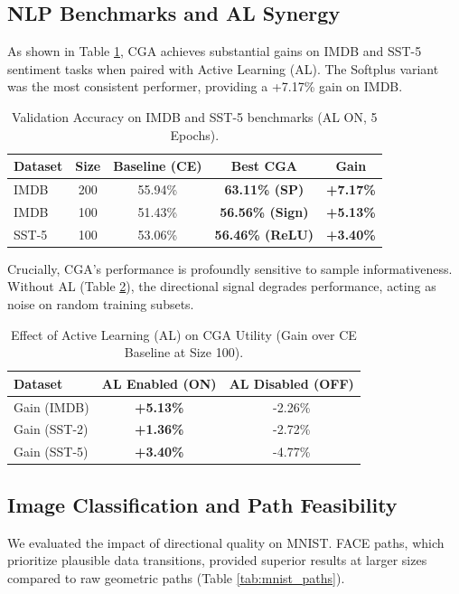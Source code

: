 \documentclass[sigconf,anonymous]{aamas}
\begin{document}
\subsection{NLP Benchmarks and AL Synergy}
As shown in Table \ref{tab:nlp_results}, CGA achieves substantial gains on IMDB and SST-5 sentiment tasks when paired with Active Learning (AL). The Softplus variant was the most consistent performer, providing a +7.17\% gain on IMDB.

\begin{table}[h]
\centering
\caption{Validation Accuracy on IMDB and SST-5 benchmarks (AL ON, 5 Epochs).}
\label{tab:nlp_results}
\begin{tabular}{@{}lcccc@{}}
\toprule
\textbf{Dataset} & \textbf{Size} & \textbf{Baseline (CE)} & \textbf{Best CGA} & \textbf{Gain} \\ \midrule
IMDB & 200 & 55.94\% & \textbf{63.11\% (SP)} & \textbf{+7.17\%}
 \\IMDB & 100 & 51.43\% & \textbf{56.56\% (Sign)} & \textbf{+5.13\%}
 \\SST-5 & 100 & 53.06\% & \textbf{56.46\% (ReLU)} & \textbf{+3.40\%}
 \\ \bottomrule
\end{tabular}
\end{table}

Crucially, CGA's performance is profoundly sensitive to sample informativeness. Without AL (Table \ref{tab:al_synergy}), the directional signal degrades performance, acting as noise on random training subsets.

\begin{table}[h]
\centering
\caption{Effect of Active Learning (AL) on CGA Utility (Gain over CE Baseline at Size 100).}
\label{tab:al_synergy}
\begin{tabular}{lcc}
\toprule
\textbf{Dataset} & \textbf{AL Enabled (ON)} & \textbf{AL Disabled (OFF)} \\ \midrule
Gain (IMDB) & \textbf{+5.13\%} & -2.26\%
 \\Gain (SST-2) & \textbf{+1.36\%} & -2.72\%
 \\Gain (SST-5) & \textbf{+3.40\%} & -4.77\%
 \\ \bottomrule
\end{tabular}
\end{table}

\subsection{Image Classification and Path Feasibility}
We evaluated the impact of directional quality on MNIST. FACE paths, which prioritize plausible data transitions, provided superior results at larger sizes compared to raw geometric paths (Table \ref{tab:mnist_paths}).
\end{document}
